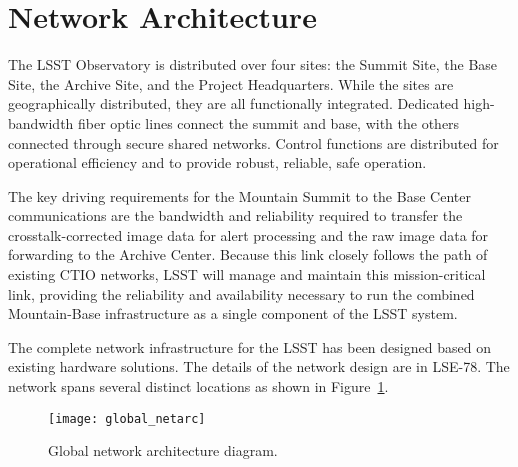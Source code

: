 \section{Network Architecture} \label{sec:netarc}



The LSST Observatory is distributed over four sites: the Summit Site, the Base Site, the Archive Site, 
and the Project Headquarters. While the sites are geographically distributed, they are all functionally 
integrated. Dedicated high-bandwidth fiber optic lines connect the summit and base, with the others 
connected through secure shared networks. Control functions are distributed for operational efficiency 
and to provide robust, reliable, safe operation.


The key driving requirements for the Mountain Summit to the Base Center communications are the 
bandwidth and reliability required to transfer the crosstalk-corrected image data for alert processing and 
the raw image data for forwarding to the Archive Center. Because this link closely follows the path of 
existing CTIO networks, LSST will manage and maintain this mission-critical link, providing the reliability 
and availability necessary to run the combined Mountain-Base infrastructure as a single component of 
the LSST system.


The complete network infrastructure for the LSST has been designed based on existing hardware 
solutions. The details of the network design are in LSE-78. The network spans several distinct locations 
as shown in Figure~\ref{fig:global_netarc}.


\begin{figure}
\begin{center}
\texttt{[image: global\_netarc]}
\caption{Global network architecture diagram. \label{fig:global_netarc}}
\end{center}
\end{figure}


